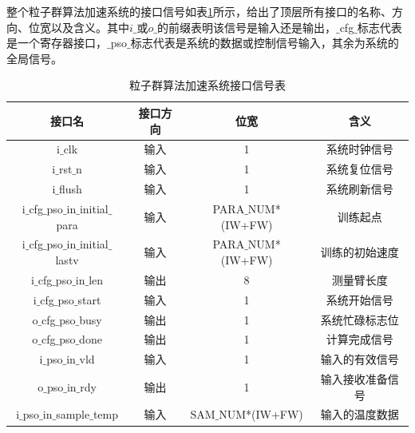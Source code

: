 整个粒子群算法加速系统的接口信号如表\ref{tab:粒子群算法加速系统接口信号表}所示，给出了顶层所有接口的名称、方向、位宽以及含义。其中$i\_$或$o\_$的前缀表明该信号是输入还是输出，$\_$cfg$\_$标志代表是一个寄存器接口，$\_$pso$\_$标志代表是系统的数据或控制信号输入，其余为系统的全局信号。
\begin{table}[H]
    \centering
    \caption{粒子群算法加速系统接口信号表}
    \label{tab:粒子群算法加速系统接口信号表}
    \begin{tabular}{c|c|c|c}
        \hline
        接口名                                       & 接口方向  & 位宽               &含义                         \\ \hline
        i$\_$clk                                    & 输入      & 1                     & 系统时钟信号              \\ \hline
        i$\_$rst$\_$n                               & 输入      & 1                     & 系统复位信号   \\ \hline
        i$\_$flush                                  & 输入      & 1                     & 系统刷新信号              \\ \hline
        i$\_$cfg$\_$pso$\_$in$\_$initial$\_$para    & 输入      & PARA$\_$NUM*(IW+FW)   & 训练起点                 \\ \hline
        i$\_$cfg$\_$pso$\_$in$\_$initial$\_$lastv   & 输入      & PARA$\_$NUM*(IW+FW)   & 训练的初始速度            \\ \hline
        i$\_$cfg$\_$pso$\_$in$\_$len                & 输出      & 8                     & 测量臂长度                \\ \hline
        i$\_$cfg$\_$pso$\_$start                    & 输入      & 1                     & 系统开始信号              \\ \hline
        o$\_$cfg$\_$pso$\_$busy                     & 输出      & 1                     & 系统忙碌标志位            \\ \hline
        o$\_$cfg$\_$pso$\_$done                     & 输出      & 1                     & 计算完成信号              \\ \hline
        i$\_$pso$\_$in$\_$vld                       & 输入      & 1                     & 输入的有效信号            \\ \hline
        o$\_$pso$\_$in$\_$rdy                       & 输出      & 1                     & 输入接收准备信号          \\ \hline
        i$\_$pso$\_$in$\_$sample$\_$temp            & 输入      & SAM$\_$NUM*(IW+FW)    & 输入的温度数据            \\ \hline

\end{tabular}
\end{table}
